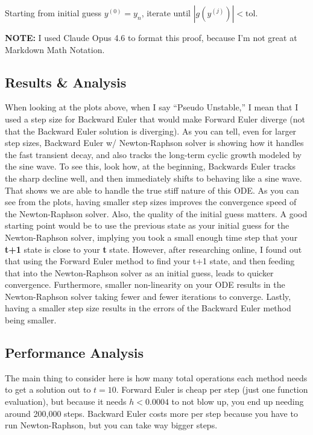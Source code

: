 \documentclass[11pt]{article}
\begin{document}
Starting from initial guess \(y^{(0)} = y_n\), iterate until
\(|g(y^{(j)})| < \text{tol}\).

\textbf{NOTE:} I used Claude Opus 4.6 to format this proof, because I'm
not great at Markdown Math Notation.

\subsection{Results \& Analysis}\label{results-analysis}

When looking at the plots above, when I say ``Pseudo Unstable,'' I mean
that I used a step size for Backward Euler that would make Forward Euler
diverge (not that the Backward Euler solution is diverging). As you can
tell, even for larger step sizes, Backward Euler w/ Newton-Raphson
solver is showing how it handles the fast transient decay, and also
tracks the long-term cyclic growth modeled by the sine wave. To see
this, look how, at the beginning, Backwards Euler tracks the sharp
decline well, and then immediately shifts to behaving like a sine wave.
That shows we are able to handle the true stiff nature of this ODE. As
you can see from the plots, having smaller step sizes improves the
convergence speed of the Newton-Raphson solver. Also, the quality of the
initial guess matters. A good starting point would be to use the
previous state as your initial guess for the Newton-Raphson solver,
implying you took a small enough time step that your \textbf{t+1} state
is close to your \textbf{t} state. However, after researching online, I
found out that using the Forward Euler method to find your t+1 state,
and then feeding that into the Newton-Raphson solver as an initial
guess, leads to quicker convergence. Furthermore, smaller non-linearity
on your ODE results in the Newton-Raphson solver taking fewer and fewer
iterations to converge. Lastly, having a smaller step size results in
the errors of the Backward Euler method being smaller.

\subsection{Performance Analysis}\label{performance-analysis}

The main thing to consider here is how many total operations each method
needs to get a solution out to \(t = 10\). Forward Euler is cheap per
step (just one function evaluation), but because it needs \(h < 0.0004\)
to not blow up, you end up needing around 200,000 steps. Backward Euler
costs more per step because you have to run Newton-Raphson, but you can
take way bigger steps.
\end{document}
